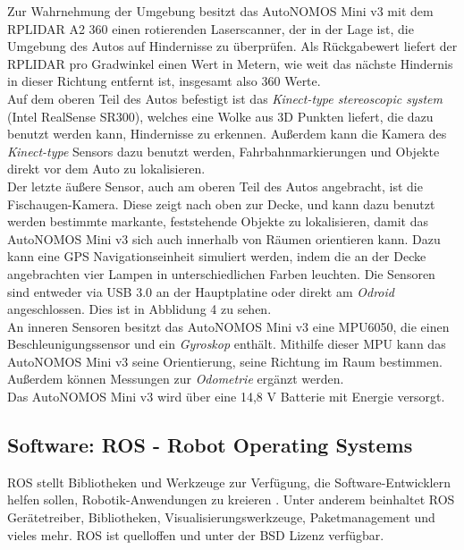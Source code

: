 Zur Wahrnehmung der Umgebung besitzt das AutoNOMOS Mini v3 mit dem RPLIDAR A2 360 einen rotierenden Laserscanner, der in der Lage ist, die Umgebung des Autos auf Hindernisse zu überprüfen. Als Rückgabewert liefert der RPLIDAR pro Gradwinkel einen Wert in Metern, wie weit das nächste Hindernis in dieser Richtung entfernt ist, insgesamt also 360 Werte. \\
Auf dem oberen Teil des Autos befestigt ist das \textit{Kinect-type stereoscopic system} (Intel RealSense SR300), welches eine Wolke aus 3D Punkten liefert, die dazu benutzt werden kann, Hindernisse zu erkennen. Außerdem kann die Kamera des \textit{Kinect-type} Sensors dazu benutzt werden, Fahrbahnmarkierungen und Objekte direkt vor dem Auto zu lokalisieren.\\
Der letzte äußere Sensor, auch am oberen Teil des Autos angebracht, ist die Fischaugen-Kamera. Diese zeigt nach oben zur Decke, und kann dazu benutzt werden bestimmte markante, feststehende Objekte zu lokalisieren, damit das AutoNOMOS Mini v3 sich auch innerhalb von Räumen orientieren kann. Dazu kann eine GPS Navigationseinheit simuliert werden, indem die an der Decke angebrachten vier Lampen in unterschiedlichen Farben leuchten.
Die Sensoren sind entweder via USB 3.0 an der Hauptplatine oder direkt am \textit{Odroid} angeschlossen. Dies ist in Abblidung 4 zu sehen.\\
An inneren Sensoren besitzt das AutoNOMOS Mini v3 eine MPU6050, die einen Beschleunigungssensor und ein \textit{Gyroskop} enthält. Mithilfe dieser MPU kann das AutoNOMOS Mini v3 seine Orientierung, seine Richtung im Raum bestimmen. Außerdem können Messungen zur \textit{Odometrie} ergänzt werden.\\
Das AutoNOMOS Mini v3 wird über eine 14,8 V Batterie mit Energie versorgt.

\subsection{Software: ROS - Robot Operating Systems}
ROS stellt Bibliotheken und Werkzeuge zur Verfügung, die Software-Entwicklern helfen sollen, Robotik-Anwendungen zu kreieren \citep{ROS}. Unter anderem beinhaltet ROS Gerätetreiber, Bibliotheken, Visualisierungswerkzeuge, Paketmanagement und vieles mehr. ROS ist quelloffen und unter der BSD Lizenz verfügbar.\\

